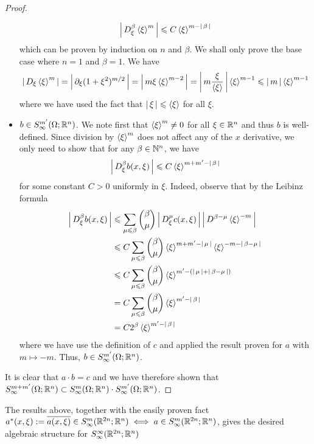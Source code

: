 \documentclass{article}
\begin{document}
\begin{proof}
\begin{itemize}
        \[
        \abs{D^\beta_\xi \sym[\xi]^m} \leq C \sym[\xi]^{m - \abs{\beta}}
        \]
        which can be proven by induction on $n$ and $\beta$. We shall only prove the base case where $n = 1$ and $\beta = 1$. We have 
        \begin{align*}
        \abs{D_\xi \sym[\xi]^m} = \abs{\p_\xi (1 + \xi^2)^{m/2}} = \abs{m\xi \sym[\xi]^{m - 2}} = \abs{m \frac{\xi}{\sym[\xi]}} \sym[\xi]^{m - 1} \leq \abs{m} \sym[\xi]^{m - 1}
        \end{align*}
        where we have used the fact that $\abs{\xi} \leq \sym[\xi]$ for all $\xi$. 
        \item $b \in S^{m'}_\infty(\Omega; \R^n)$. We note first that $\sym[\xi]^m \neq 0$ for all $\xi \in \R^n$ and thus $b$ is well-defined. Since division by $\sym[\xi]^m$ does not affect any of the $x$ derivative, we only need to show that for any $\beta \in \N^n$, we have
        \[
        \abs{D^\beta_\xi b(x, \xi)} \leq C \sym[\xi]^{m + m' - \abs{\beta}}
        \]
        for some constant $C > 0$ uniformly in $\xi$. Indeed, observe that by the Leibinz formula
        \begin{align*}
        \abs{D^\beta_\xi b(x, \xi)} 
        & \leq \sum_{\mu \leq \beta} \binom{\beta}{\mu} \abs{D^\mu_\xi c(x, \xi)} \abs{D^{\beta - \mu} \sym[\xi]^{-m}} \\
        & \leq C \sum_{\mu \leq \beta} \binom{\beta}{\mu} \sym[\xi]^{m + m' - \abs{\mu}} \sym[\xi]^{-m - \abs{\beta - \mu}} \\
        & \leq C \sum_{\mu \leq \beta} \binom{\beta}{\mu} \sym[\xi]^{ m' - (\abs{\mu} +  \abs{\beta - \mu})} \\
        & = C \sum_{\mu \leq \beta} \binom{\beta}{\mu} \sym[\xi]^{ m' -\abs{\beta}} \\
        &= C 2^{\beta} \sym[\xi]^{ m' -\abs{\beta}} 
        \end{align*}
        where we have use the definition of $c$ and applied the result proven for $a$ with $m \mapsto -m$. Thus, $b \in S^{m'}_\infty(\Omega; \R^n)$. 
    \end{itemize}
    It is clear that $a \cdot b = c$ and we have therefore shown that $S^{m + m'}_\infty(\Omega; \R^n) \subset S^{m}_\infty(\Omega; \R^n) \cdot S^{m'}_\infty(\Omega; \R^n)$. 
\end{proof}

The results above, together with the easily proven fact $ a^*(x, \xi) := \overline{a(x, \xi)} \in S^{m}_\infty(\R^{2n}; \R^n) \iff a \in S^{m}_\infty(\R^{2n}; \R^n)$, gives the desired algebraic structure for $S^{\infty}_\infty(\R^{2n}; \R^n)$
\end{document}
